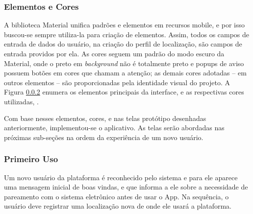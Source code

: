 \subsubsection{Elementos e Cores}
A biblioteca Material unifica padrões e elementos em recursos mobile, e por isso buscou-se sempre utiliza-la para criação de elementos. Assim, todos os campos de entrada de dados do usuário, na criação do perfil de localização, são campos de entrada providos por ela. As cores seguem um padrão do modo escuro da Material, onde o preto em \textit{background} não é totalmente preto e popups de aviso possuem botões em cores que chamam a atenção; as demais cores adotadas -- em outros elementos -- são proporcionadas pela identidade visual do projeto. A Figura \ref{} enumera os elementos principais da interface, e as respectivas cores utilizadas, .


Com base nesses elementos, cores, e nas telas protótipo desenhadas anteriormente, implementou-se o aplicativo. As telas serão abordadas nas próximas sub-seções na ordem da experiência de um novo usuário.

\subsubsection{Primeiro Uso}

Um novo usuário da plataforma é reconhecido pelo sistema e para ele aparece uma mensagem inicial de boas vindas, e que informa a ele sobre a necessidade de pareamento com o sistema eletrônico antes de usar o App. Na sequência, o usuário deve registrar uma localização nova de onde ele usará a plataforma. 


